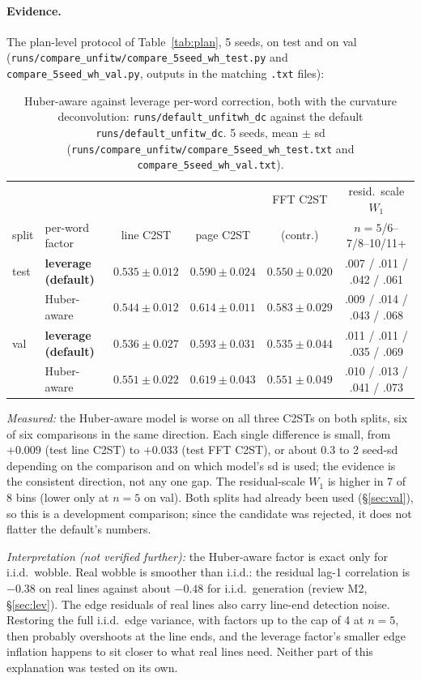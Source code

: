 \documentclass[11pt,a4paper]{article}
\newcommand{\src}[1]{{\footnotesize\texttt{#1}}}
\begin{document}
\paragraph{Evidence.} The plan-level protocol of Table~\ref{tab:plan}, 5 seeds,
on test and on val (\src{runs/compare\_unfitw/compare\_5seed\_wh\_test.py}
and \src{compare\_5seed\_wh\_val.py}, outputs in the matching \texttt{.txt}
files):
\begin{table}[H]\centering\small
\begin{tabular}{llcccc}
\toprule
 & & & & FFT C2ST & resid.\ scale $W_1$\\
split & per-word factor & line C2ST & page C2ST & (contr.) & $n=5$/6--7/8--10/11+\\
\midrule
test & \textbf{leverage (default)} & $0.535\pm0.012$ & $0.590\pm0.024$ & $0.550\pm0.020$ & .007 / .011 / .042 / .061\\
     & Huber-aware & $0.544\pm0.012$ & $0.614\pm0.011$ & $0.583\pm0.029$ & .009 / .014 / .043 / .068\\
\midrule
val  & \textbf{leverage (default)} & $0.536\pm0.027$ & $0.593\pm0.031$ & $0.535\pm0.044$ & .011 / .011 / .035 / .069\\
     & Huber-aware & $0.551\pm0.022$ & $0.619\pm0.043$ & $0.551\pm0.049$ & .010 / .013 / .041 / .073\\
\bottomrule
\end{tabular}
\caption{Huber-aware against leverage per-word correction, both with the
curvature deconvolution: \texttt{runs/default\_unfitwh\_dc} against the
default \texttt{runs/default\_unfitw\_dc}. 5 seeds, mean $\pm$ sd
(\src{runs/compare\_unfitw/compare\_5seed\_wh\_test.txt} and \src{compare\_5seed\_wh\_val.txt}).}
\label{tab:huber}
\end{table}

\emph{Measured:} the Huber-aware model is worse on all three C2STs on both
splits, six of six comparisons in the same direction. Each single difference
is small, from $+0.009$ (test line C2ST) to $+0.033$ (test FFT C2ST), or
about 0.3 to 2 seed-sd depending on the comparison and on which model's sd is
used; the evidence is the consistent direction, not any one gap. The
residual-scale $W_1$ is higher in 7 of 8 bins (lower only at $n=5$ on val). Both splits had already been used (\S\ref{sec:val}), so this is a
development comparison; since the candidate was rejected, it does not
flatter the default's numbers.

\emph{Interpretation (not verified further):} the Huber-aware factor is exact
only for i.i.d.\ wobble. Real wobble is smoother than i.i.d.: the residual
lag-1 correlation is $-0.38$ on real lines against about $-0.48$ for i.i.d.\
generation (review M2, \S\ref{sec:lev}). The edge residuals of real lines also
carry line-end detection noise. Restoring the full i.i.d.\ edge variance,
with factors up to the cap of 4 at $n=5$, then probably overshoots at the
line ends, and the leverage factor's smaller edge inflation happens to sit
closer to what real lines need. Neither part of this explanation was tested
on its own.
\end{document}
